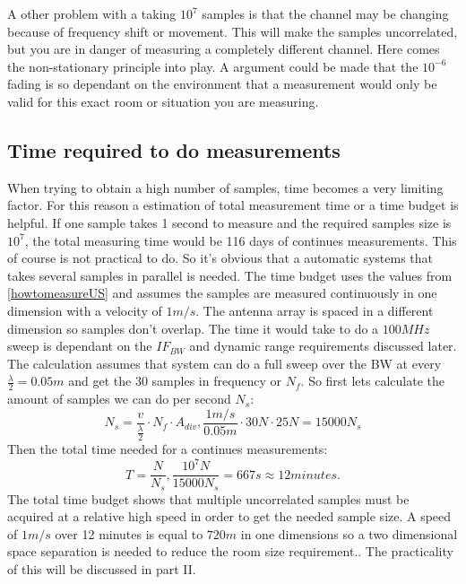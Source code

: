 A other problem with a taking $10^7$ samples is that the channel may be changing because of frequency shift or movement. This will make the samples uncorrelated, but you are in danger of measuring a completely different channel. Here comes the non-stationary principle into play. A argument could be made that the $10^{-6}$ fading is so dependant on the environment that a measurement would only be valid for this exact room or situation you are measuring.

\subsection{Time required to do measurements}
When trying to obtain a high number of samples, time becomes a very limiting factor. For this reason a estimation of total measurement time or a time budget is helpful. If one sample takes 1 second to measure and the required samples size is $10^7$, the total measuring time would be 116 days of continues measurements. This of course is not practical to do. So it's obvious that a automatic systems that takes several samples in parallel is needed. The time budget uses the values from  \autoref{howtomeasureUS} and assumes the samples are measured continuously in one dimension with a velocity of $1m/s$. 
The antenna array is spaced in a different dimension so samples don't overlap. The time it would take to do a $100MHz$ sweep is dependant on the $IF_{BW}$ and dynamic range requirements discussed later. The calculation assumes that system can do a full sweep over the BW at every $\frac{\lambda}{2} = 0.05m$ and get the 30 samples in frequency or $N_f$. So first lets calculate the amount of samples we can do per second $N_s$:
\begin{equation}
N_s = \frac{v}{\frac{\lambda}{2}}\cdot N_f \cdot A_{div}, \frac{1m/s}{0.05m} \cdot 30N \cdot 25N = 15000N_s
\end{equation}
Then the total time needed for a continues measurements:
\begin{equation}
T = \frac{N}{N_s} , \frac{10^7N}{15000N_s} = 667s \approx 12 minutes.
\end{equation}
The total time budget shows that multiple uncorrelated samples must be acquired at a relative high speed in order to get the needed sample size. A speed of $1m/s$ over 12 minutes is equal to $720m$ in one dimensions so a two dimensional space separation is needed to reduce the room size requirement.. The practicality of this will be discussed in part II.


